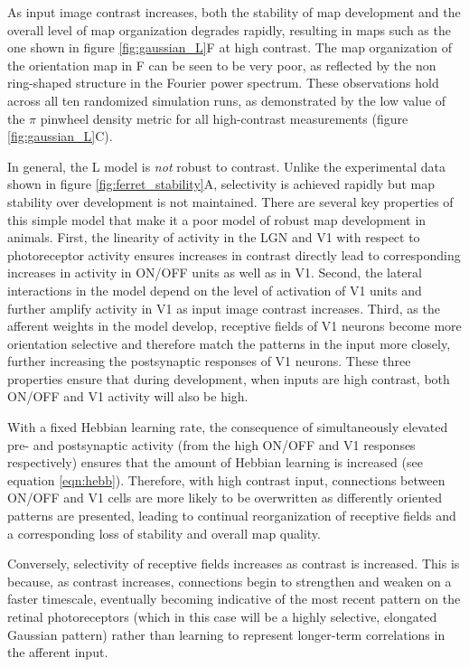 \documentclass{article}
\begin{document}
As input image contrast increases, both the stability of map
development and the overall level of map organization degrades
rapidly, resulting in maps such as the one shown in figure
\ref{fig:gaussian_L}F at high contrast.  The map organization of the
orientation map in F can be seen to be very poor, as reflected by
the non ring-shaped structure in the Fourier power
  spectrum. These observations hold across all ten randomized
simulation runs, as demonstrated by the low value of the $\pi$
pinwheel density metric for all high-contrast measurements (figure
\ref{fig:gaussian_L}C).

In general, the L model is \emph{not} robust to contrast.  Unlike the
experimental data shown in figure \ref{fig:ferret_stability}A, selectivity is
achieved rapidly but map stability over development is not
maintained. There are several key properties of this simple model that
make it a poor model of robust map development in animals.  First, the linearity
of activity in the LGN and V1 with respect to photoreceptor activity
ensures increases in contrast directly lead to corresponding increases
in activity in ON/OFF units as well as in V1. Second, the lateral interactions
in the model depend on the level of activation of V1 units and further
amplify activity in V1 as input image contrast increases. Third, as
the afferent weights in the model develop, receptive fields of V1
neurons become more orientation selective and therefore match the
patterns in the input more closely, further increasing the
postsynaptic responses of V1 neurons. These three properties ensure
that during development, when inputs are high contrast, both ON/OFF
and V1 activity will also be high.

With a fixed Hebbian learning rate, the consequence of simultaneously
elevated pre- and postsynaptic activity (from the high ON/OFF and V1 responses respectively) ensures that the amount of Hebbian learning is increased (see
equation \ref{eqn:hebb}).  Therefore, with high contrast input,
connections between ON/OFF and V1 cells are more likely to be
overwritten as differently oriented patterns are presented, leading to
continual reorganization of receptive fields and a corresponding loss
of stability and overall map quality.

Conversely, selectivity of receptive fields increases as contrast is
increased.  This is because, as contrast increases, connections begin
to strengthen and weaken on a faster timescale, eventually becoming
indicative of the most recent pattern on the retinal photoreceptors
(which in this case will be a highly selective, elongated Gaussian
pattern) rather than learning to represent longer-term correlations in
the afferent input.
\end{document}
